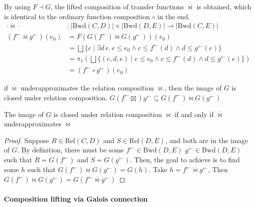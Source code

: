 \documentclass{llncs}
\newcommand{\Rel}{\mathrm{Rel}}
\newcommand{\Unidir}{\mathrm{Bwd}}
\newcommand{\fb}{{f^{\leftarrow}}}
\newcommand{\gb}{{g^{\leftarrow}}}
\newcommand{\bigjoin}{\bigsqcup}
\newcommand{\comp}{\circ}
\newcommand{\bowtielift}{\mathbin{\overline{\bowtie}}}
\begin{document}
    By using $F \dashv G$, the lifted composition of transfer functions $\bowtielift$ is obtained, which is identical to the ordinary function composition $\comp$ in the end.
    \begin{align*}
      \cdot \bowtielift \cdot &: \left| \Unidir(C, D) \right| \times  \left| \Unidir(D, E) \right| \to  \left| \Unidir(C, E) \right| \\
      (\fb \bowtielift \gb) (e_{0}) &= F(G(\fb) \bowtie G(\gb)) (e_{0}) \\
                                  &= \bigjoin \{ c \mid \exists d\, e.\,e \leq e_{0} \land c \leq \fb(d) \land d \leq \gb(e) \} \\
                                  &= \pi_{1} (\bigjoin \{ (c, d , e) \mid e \leq e_{0} \land c \leq \fb(d) \land d \leq \gb(e) \}) \\
                                  &= (\fb \comp \gb)(e_{0})
    \end{align*}
    \begin{proposition}
      if $\bowtielift$ underapproximates the relation composition $\bowtie$, then the image of $G$ is closed under relation composition.
      $ G (\fb \boxtimes) \gb \subseteq G(\fb) \bowtie G(\gb) $
    \end{proposition}
    \begin{proposition}
       The image of $G$ is closed under relation composition $\bowtie$ if and only if $\bowtielift$ underapproximates $\bowtie$
      \begin{proof}
        Suppose $R \in \Rel(C , D)$ and $S \in \Rel(D , E)$, and both are in the image of $G$.
        By definition, there must be some $\fb \in \Unidir(D , E)$ $\gb \in \Unidir(D , E)$ such that $R = G(\fb)$ and $S = G(\gb)$. Then, the goal to achieve is to find some $h$ such that $G(\fb) \bowtie G(\gb) = G(h)$. Take $h = \fb \bowtielift \gb$,
        Then $G(\fb) \bowtie G(\gb) = G(\fb \bowtielift \gb)$
      \end{proof}
    \end{proposition}
  \paragraph{Composition lifting via Galois connection}
\end{document}
